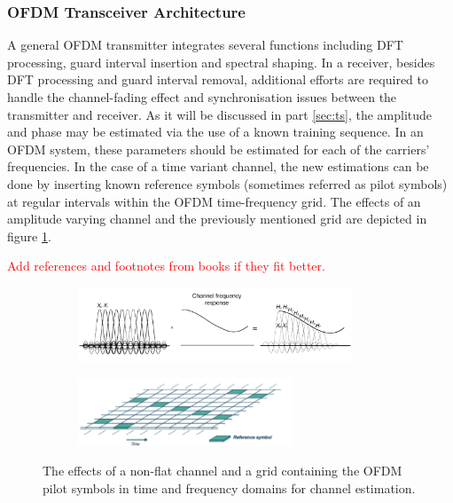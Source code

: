 \documentclass[12pt,a4paper,openright]{report}
\begin{document}
\subsubsection{OFDM Transceiver Architecture}

A general OFDM transmitter integrates several functions including DFT processing, guard interval insertion and spectral shaping. In a receiver, besides DFT processing and guard interval removal, additional efforts are required to handle the channel-fading effect and synchronisation issues between the transmitter and receiver.
As it will be discussed in part \ref{sec:ts}, the amplitude and phase may be estimated via the use of a known training sequence. In an OFDM system, these parameters should be estimated for each of the carriers' frequencies. In the case of a time variant channel, the new estimations can be done by inserting known reference symbols (sometimes referred as pilot symbols) at regular intervals within the OFDM time-frequency grid. The effects of an amplitude varying channel and the previously mentioned grid are depicted in figure \ref{fig:ofdmchannel}.

\textcolor{red}{Add references and footnotes from books if they fit better.}
\begin{figure}[H]
 \centering
	\begin{subfigure}[H]{0.9\textwidth}
 	\centering
    \includegraphics[width=0.9\textwidth]{ofdmchannel.pdf}

	\end{subfigure}
	
	\begin{subfigure}[H]{0.9\textwidth}
 	\centering
    \includegraphics[width=0.7\textwidth]{ofdmgrid.pdf}
 	\end{subfigure}
    \caption[The effects of a non-flat channel and a grid containing the OFDM pilot symbols]{The effects of a non-flat channel and a grid containing the OFDM pilot symbols in time and frequency domains for channel estimation.}
    \label{fig:ofdmchannel}
\end{figure}
\end{document}
